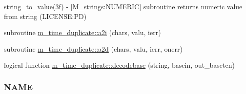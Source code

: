 \begin{DoxyCompactItemize}
\begin{DoxyCompactList}
string\+\_\+to\+\_\+value(3f) -\/ \mbox{[}M\+\_\+strings\+:N\+U\+M\+E\+R\+IC\mbox{]} subroutine returns numeric value from string (L\+I\+C\+E\+N\+SE\+:PD) \end{DoxyCompactList}\item 
subroutine \mbox{\hyperlink{namespacem__time__duplicate_aaf8891d2fdbd165fecbdf78335f926fc}{m\+\_\+time\+\_\+duplicate\+::a2i}} (chars, valu, ierr)
\item 
subroutine \mbox{\hyperlink{namespacem__time__duplicate_ab86bb390cc56184faeef5543735eecc4}{m\+\_\+time\+\_\+duplicate\+::a2d}} (chars, valu, ierr, onerr)
\item 
logical function \mbox{\hyperlink{namespacem__time__duplicate_a66a83a4b3d6324843c984658784b2c4e}{m\+\_\+time\+\_\+duplicate\+::decodebase}} (string, basein, out\+\_\+baseten)
\begin{DoxyCompactList}\small\item\em \subsubsection*{N\+A\+ME}\end{DoxyCompactList}\end{DoxyCompactItemize}
